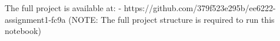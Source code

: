 \markdownRendererDocumentBegin
The full project is available at: - https://github.com/379f523e295b/ee6222-assignment1-fc9a\markdownRendererInterblockSeparator
{}(NOTE: The full project structure is required to run this notebook)\markdownRendererDocumentEnd